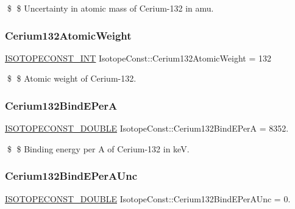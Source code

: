 \$ \$ Uncertainty in atomic mass of Cerium-\/132 in amu. \mbox{\label{group___isotope_const-_cerium-_ce132_ga9fec2fe23552da3224e3db2f9a41ddb2}} 
\subsubsection{\texorpdfstring{Cerium132\+Atomic\+Weight}{Cerium132AtomicWeight}}
{\footnotesize\ttfamily \mbox{\hyperlink{group___isotope_const-_macros_ga5f18360b3e99483a35c32d789e62621c}{I\+S\+O\+T\+O\+P\+E\+C\+O\+N\+S\+T\+\_\+\+I\+NT}} Isotope\+Const\+::\+Cerium132\+Atomic\+Weight = 132}

\$ \$ Atomic weight of Cerium-\/132. \mbox{\label{group___isotope_const-_cerium-_ce132_ga39536681ac9b32c5a7bb49e47ea77135}} 
\subsubsection{\texorpdfstring{Cerium132\+Bind\+E\+PerA}{Cerium132BindEPerA}}
{\footnotesize\ttfamily \mbox{\hyperlink{group___isotope_const-_macros_ga8f45a7272ce02c0b4c65c44636ed719a}{I\+S\+O\+T\+O\+P\+E\+C\+O\+N\+S\+T\+\_\+\+D\+O\+U\+B\+LE}} Isotope\+Const\+::\+Cerium132\+Bind\+E\+PerA = 8352.}

\$ \$ Binding energy per A of Cerium-\/132 in keV. \mbox{\label{group___isotope_const-_cerium-_ce132_ga31378e3efb89eb2fcc0f8f2c0b35b142}} 
\subsubsection{\texorpdfstring{Cerium132\+Bind\+E\+Per\+A\+Unc}{Cerium132BindEPerAUnc}}
{\footnotesize\ttfamily \mbox{\hyperlink{group___isotope_const-_macros_ga8f45a7272ce02c0b4c65c44636ed719a}{I\+S\+O\+T\+O\+P\+E\+C\+O\+N\+S\+T\+\_\+\+D\+O\+U\+B\+LE}} Isotope\+Const\+::\+Cerium132\+Bind\+E\+Per\+A\+Unc = 0.}

